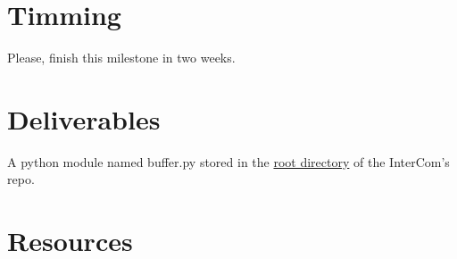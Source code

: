 \section{Timming}

Please, finish this milestone in two weeks.

\section{Deliverables}

A python module named buffer.py stored in the
\href{https://github.com/Tecnologias-multimedia/intercom}{root
  directory} of the InterCom's repo.

\section{Resources}


